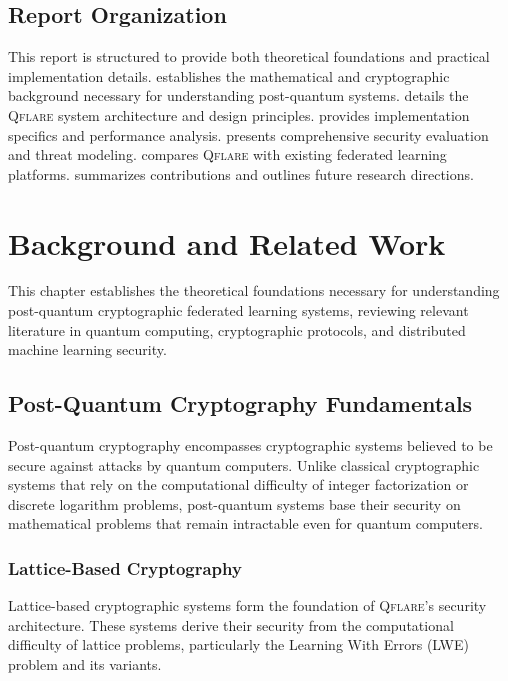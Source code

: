 ﻿\documentclass[12pt,a4paper,twoside]{book}
\newcommand{\qflare}{\textsc{Qflare}}
\begin{document}
\section{Report Organization}
\label{sec:organization}

This report is structured to provide both theoretical foundations and practical implementation details.  establishes the mathematical and cryptographic background necessary for understanding post-quantum systems.  details the \qflare{} system architecture and design principles.  provides implementation specifics and performance analysis.  presents comprehensive security evaluation and threat modeling.  compares \qflare{} with existing federated learning platforms.  summarizes contributions and outlines future research directions.

\chapter{Background and Related Work}
\label{ch:background}

This chapter establishes the theoretical foundations necessary for understanding post-quantum cryptographic federated learning systems, reviewing relevant literature in quantum computing, cryptographic protocols, and distributed machine learning security.

\section{Post-Quantum Cryptography Fundamentals}
\label{sec:pqc-fundamentals}

Post-quantum cryptography encompasses cryptographic systems believed to be secure against attacks by quantum computers. Unlike classical cryptographic systems that rely on the computational difficulty of integer factorization or discrete logarithm problems, post-quantum systems base their security on mathematical problems that remain intractable even for quantum computers.

\subsection{Lattice-Based Cryptography}
\label{subsec:lattice-crypto}

Lattice-based cryptographic systems form the foundation of \qflare{}'s security architecture. These systems derive their security from the computational difficulty of lattice problems, particularly the Learning With Errors (LWE) problem and its variants.
\end{document}
